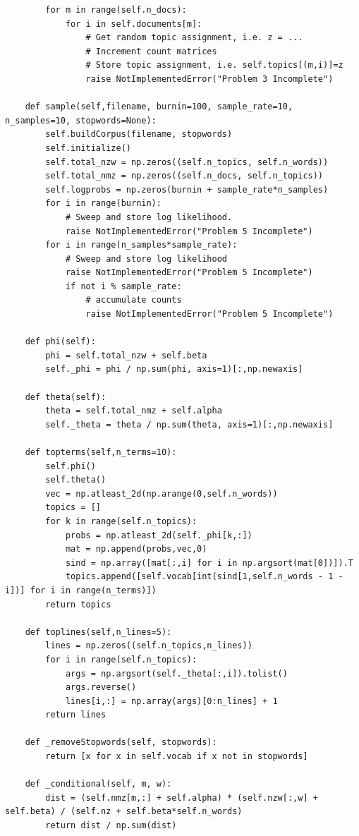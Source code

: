 \begin{lstlisting}
        for m in range(self.n_docs):
            for i in self.documents[m]:
                # Get random topic assignment, i.e. z = ...
                # Increment count matrices
                # Store topic assignment, i.e. self.topics[(m,i)]=z
                raise NotImplementedError("Problem 3 Incomplete")

    def sample(self,filename, burnin=100, sample_rate=10, n_samples=10, stopwords=None):
        self.buildCorpus(filename, stopwords)
        self.initialize()
        self.total_nzw = np.zeros((self.n_topics, self.n_words))
        self.total_nmz = np.zeros((self.n_docs, self.n_topics))
        self.logprobs = np.zeros(burnin + sample_rate*n_samples)
        for i in range(burnin):
            # Sweep and store log likelihood.
            raise NotImplementedError("Problem 5 Incomplete")
        for i in range(n_samples*sample_rate):
            # Sweep and store log likelihood
            raise NotImplementedError("Problem 5 Incomplete")
            if not i % sample_rate:
                # accumulate counts
                raise NotImplementedError("Problem 5 Incomplete")

    def phi(self):
        phi = self.total_nzw + self.beta
        self._phi = phi / np.sum(phi, axis=1)[:,np.newaxis]

    def theta(self):
        theta = self.total_nmz + self.alpha
        self._theta = theta / np.sum(theta, axis=1)[:,np.newaxis]

    def topterms(self,n_terms=10):
        self.phi()
        self.theta()
        vec = np.atleast_2d(np.arange(0,self.n_words))
        topics = []
        for k in range(self.n_topics):
            probs = np.atleast_2d(self._phi[k,:])
            mat = np.append(probs,vec,0)
            sind = np.array([mat[:,i] for i in np.argsort(mat[0])]).T
            topics.append([self.vocab[int(sind[1,self.n_words - 1 - i])] for i in range(n_terms)])
        return topics

    def toplines(self,n_lines=5):
        lines = np.zeros((self.n_topics,n_lines))
        for i in range(self.n_topics):
            args = np.argsort(self._theta[:,i]).tolist()
            args.reverse()
            lines[i,:] = np.array(args)[0:n_lines] + 1
        return lines

    def _removeStopwords(self, stopwords):
        return [x for x in self.vocab if x not in stopwords]

    def _conditional(self, m, w):
        dist = (self.nmz[m,:] + self.alpha) * (self.nzw[:,w] + self.beta) / (self.nz + self.beta*self.n_words)
        return dist / np.sum(dist)


\end{lstlisting}
